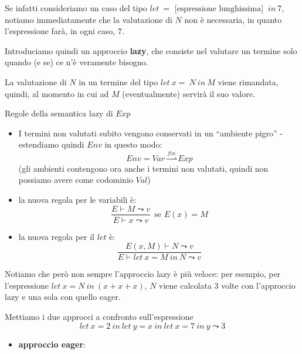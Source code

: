 \documentclass[a4paper,11pt]{report}
\begin{document}
Se infatti consideriamo un caso del tipo
\( let \ = \text{ [espressione lunghissima] } \ in \ 7 \), notiamo immediatamente che la valutazione di \( N \) non è necessaria, in quanto l'espressione farà, in ogni caso, \( 7 \).

Introduciamo quindi un approccio \textbf{lazy}, che consiste nel valutare un termine solo quando (e se) ce n'è veramente bisogno. 

La valutazione di \( N \) in un termine del tipo \( let \ x = \ N \ in \ M \) viene rimandata, quindi, al momento in cui ad \( M \) (eventualmente) servirà il suo valore.

\begin{defbox}{Regole della semantica lazy di \(Exp\)}{}
   \begin{itemize}
    \item I termini non valutati subito vengono conservati in un ``ambiente pigro'' - estendiamo quindi \( Env \) in questo modo:
   \[ Env = Var \overset{fin}{\rightharpoonup} Exp \]
   (gli ambienti contengono ora anche i termini non valutati, quindi non possiamo avere come codominio \( Val \))

\item la nuova regola per le variabili è:
    \[ \frac{E\vdash M \leadsto v}{E\vdash x \leadsto v} \ \ \text{se } E(x)=M\]

\item la nuova regola per il \( let \) è:
    \[ \frac{E(x, M)\vdash N \leadsto v}{E \vdash let \ x = M \ in \ N \leadsto v} \]

   \end{itemize}
\end{defbox}

Notiamo che però non sempre l'approccio lazy è più veloce: per esempio, per l'espressione \( let \ x = N \ in \ (x+x+x) \), \( N \) viene calcolata \( 3 \) volte con l'approccio lazy e una sola con quello eager.


Mettiamo i due approcci a confronto sull'espressione \[ let \ x = 2 \ in \ let \ y = x \ in \ let \ x = 7 \ in \ y \leadsto 3 \]
  
  \begin{itemize}
      \item \textbf{approccio eager}:
  \end{itemize}
  \vspace{-1em}
\begin{prooftree}
\end{prooftree}
\end{document}
